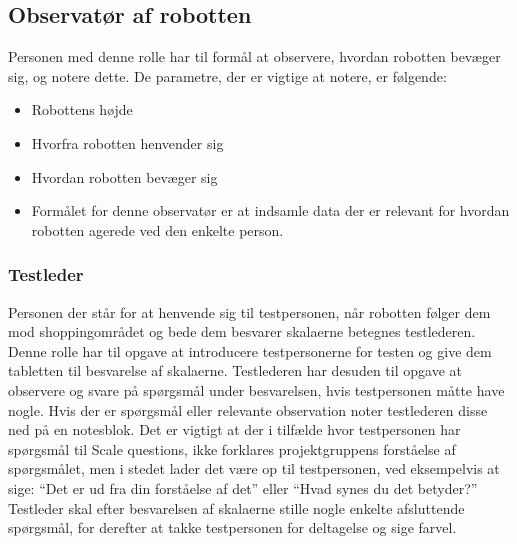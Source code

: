 \subsection{Observatør af robotten}
Personen med denne rolle har til formål at observere, hvordan robotten bevæger sig, og notere dette. De parametre, der er vigtige at notere, er følgende: 
%
\begin{itemize}
	\item Robottens højde
	\item Hvorfra robotten henvender sig
	\item Hvordan robotten bevæger sig 
	\item Formålet for denne observatør er at indsamle data der er relevant for hvordan robotten agerede ved den enkelte person. 
\end{itemize}
%
\subsubsection*{Testleder}
Personen der står for at henvende sig til testpersonen, når robotten følger dem mod shoppingområdet og bede dem besvarer skalaerne betegnes testlederen. Denne rolle har til opgave at introducere testpersonerne for testen og give dem tabletten til besvarelse af skalaerne. \blankline
%
Testlederen har desuden til opgave at observere og svare på spørgsmål under besvarelsen, hvis testpersonen måtte have nogle. Hvis der er spørgsmål eller relevante observation noter testlederen disse ned på en notesblok. Det er vigtigt at der i tilfælde hvor testpersonen har spørgsmål til Scale questions, ikke forklares projektgruppens forståelse af spørgsmålet, men i stedet lader det være op til testpersonen, ved eksempelvis at sige: “Det er ud fra din forståelse af det” eller “Hvad synes du det betyder?” \blankline
% 
Testleder skal efter besvarelsen af skalaerne stille nogle enkelte afsluttende spørgsmål, for derefter at takke testpersonen for deltagelse og sige farvel.  



